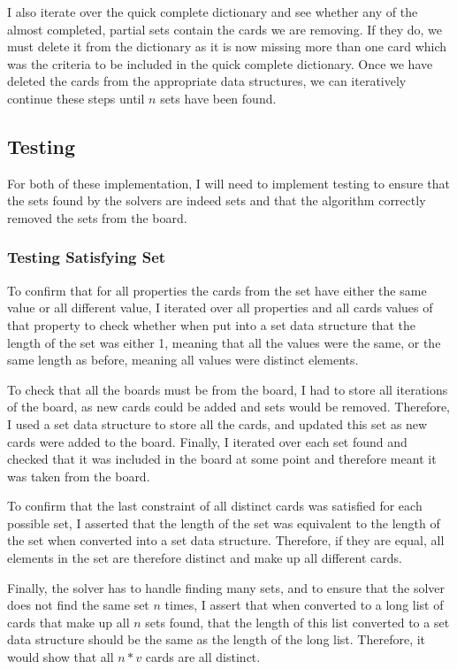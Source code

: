 \documentclass[pageno]{jpaper}
\begin{document}
I also iterate over the quick complete dictionary and see whether any of the almost completed, partial sets contain the cards we are removing. If they do, we must delete it from the dictionary as it is now missing more than one card which was the criteria to be included in the quick complete dictionary. Once we have deleted the cards from the appropriate data structures, we can iteratively continue these steps until $n$ sets have been found. 

\subsection{Testing}

For both of these implementation, I will need to implement testing to ensure that the sets found by the solvers are indeed sets and that the algorithm correctly removed the sets from the board. 

\subsubsection{Testing Satisfying Set}

To confirm that for all properties the cards from the set have either the same value or all different value, I iterated over all properties and all cards values of that property to check whether when put into a set data structure that the length of the set was either 1, meaning that all the values were the same, or the same length as before, meaning all values were distinct elements. 

To check that all the boards must be from the board, I had to store all iterations of the board, as new cards could be added and sets would be removed. Therefore, I used a set data structure to store all the cards, and updated this set as new cards were added to the board. Finally, I iterated over each set found and checked that it was included in the board at some point and therefore meant it was taken from the board. 

To confirm that the last constraint of all distinct cards was satisfied for each possible set, I asserted that the length of the set was equivalent to the length of the set when converted into a set data structure. Therefore, if they are equal, all elements in the set are therefore distinct and make up all different cards.

Finally, the solver has to handle finding many sets, and to ensure that the solver does not find the same set $n$ times, I assert that when converted to a long list of cards that make up all $n$ sets found, that the length of this list converted to a set data structure should be the same as the length of the long list. Therefore, it would show that all $n*v$ cards are all distinct. 
\end{document}
